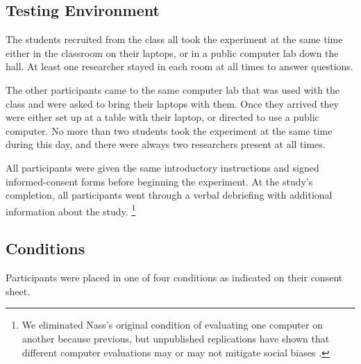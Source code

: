 \documentclass{sig-alternate-05-2015}
\begin{document}
 \subsection{Testing Environment}
 The students recruited from the class all took the experiment at the same time either in the classroom on their laptops, or in a public computer lab down the hall. At least one researcher stayed in each room at all times to answer questions.
 
 The other participants came to the same computer lab that was used with the class and were asked to bring their laptops with them.  Once they arrived they were either set up at a table with their laptop, or directed to use a public computer.  No more than two students took the experiment at the same time during this day, and there were always two researchers present at all times.  
 
 All participants were given the same introductory instructions and signed informed-consent forms before beginning the experiment.  At the study's completion, all participants went through a verbal debriefing with additional information about the study. \footnote{We eliminated Nass's original condition of evaluating one computer on another because previous, but unpublished replications have shown that different computer evaluations may or may not mitigate social biases \cite{gownivaripalli}.}

\subsection{Conditions}
Participants were placed in one of four conditions as indicated on their consent sheet.  
\end{document}
